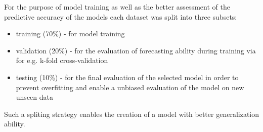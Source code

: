 For the purpose of model training as well as the better assessment of the predictive accuracy of the models each dataset was split into three subsets:
\begin{itemize}
    \item training (70\%) - for model training
    \item validation (20\%) - for the evaluation of forecasting ability during training via for e.g. k-fold cross-validation
    \item testing (10\%) - for the final evaluation of the selected model in order to prevent overfitting and enable a unbiased evaluation of the model on new unseen data
\end{itemize}

Such a spliting strategy enables the creation of a model with better generalization ability.


